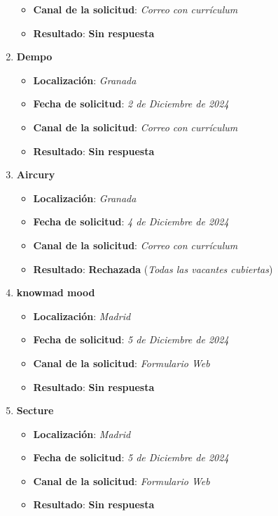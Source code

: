 \begin{enumerate}
\begin{itemize}
		\item \textbf{Canal de la solicitud}: \textit{Correo con currículum}
		\item \textbf{Resultado}: {\color{orange} \textbf{Sin respuesta}}
	\end{itemize}
	\item \textbf{Dempo}
	\begin{itemize}
		\item \textbf{Localización}: \textit{Granada}
		\item \textbf{Fecha de solicitud}: \textit{2 de Diciembre de 2024}
		\item \textbf{Canal de la solicitud}: \textit{Correo con currículum}
		\item \textbf{Resultado}: {\color{orange} \textbf{Sin respuesta}}
	\end{itemize}
		\item \textbf{Aircury}
	\begin{itemize}
		\item \textbf{Localización}: \textit{Granada}
		\item \textbf{Fecha de solicitud}: \textit{4 de Diciembre de 2024}
		\item \textbf{Canal de la solicitud}: \textit{Correo con currículum}
		\item \textbf{Resultado}: {\color{red}\textbf{Rechazada}} (\textit{Todas las vacantes cubiertas})
	\end{itemize}
	\item \textbf{knowmad mood}
	\begin{itemize}
		\item \textbf{Localización}: \textit{Madrid}
		\item \textbf{Fecha de solicitud}: \textit{5 de Diciembre de 2024}
		\item \textbf{Canal de la solicitud}: \textit{Formulario Web}
		\item \textbf{Resultado}: {\color{orange} \textbf{Sin respuesta}}
	\end{itemize}
	\item \textbf{Secture}
	\begin{itemize}
		\item \textbf{Localización}: \textit{Madrid}
		\item \textbf{Fecha de solicitud}: \textit{5 de Diciembre de 2024}
		\item \textbf{Canal de la solicitud}: \textit{Formulario Web}
		\item \textbf{Resultado}: {\color{orange} \textbf{Sin respuesta}}

\end{itemize}
\end{enumerate}

